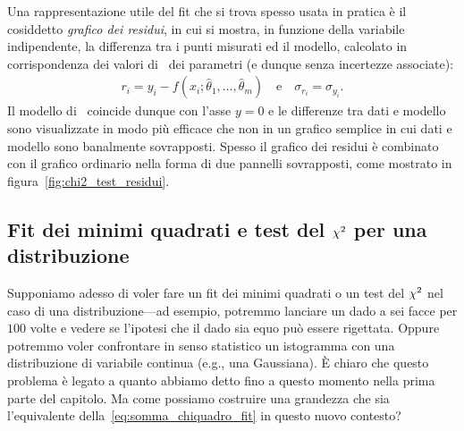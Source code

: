 Una rappresentazione utile del fit che si trova spesso usata in pratica
è il cosiddetto \emph{grafico dei residui}, in cui si mostra, in funzione
della variabile indipendente, la differenza tra i punti misurati ed il modello,
calcolato in corrispondenza dei valori di \bestfit\ dei parametri (e
dunque senza incertezze associate):
\begin{align*}
  r_i = y_i - f(x_i; \hat{\theta}_1, \ldots, \hat{\theta}_m)
  \quad \text{e} \quad
  \sigma_{r_i} = \sigma_{y_i}.
\end{align*}
Il modello di \bestfit\ coincide dunque con l'asse $y = 0$ e le
differenze tra dati e modello sono visualizzate in modo più efficace che non
in un grafico semplice in cui dati e modello sono banalmente sovrapposti.
Spesso il grafico dei residui è combinato con il grafico ordinario nella
forma di due pannelli sovrapposti, come mostrato in
figura~\ref{fig:chi2_test_residui}.



\subsection{Fit dei minimi quadrati e test del \texorpdfstring{$\chi^2$}{chi2}
  per una distribuzione}
\label{sec:test_chi2_distribuzione}

Supponiamo adesso di voler fare un fit dei minimi quadrati o un test del
$\chi^2$ nel caso di una distribuzione---ad esempio, potremmo lanciare un dado
a sei facce per $100$ volte e vedere se l'ipotesi che il dado sia equo può
essere rigettata. Oppure potremmo voler confrontare in senso statistico un
istogramma con una distribuzione di variabile continua (e.g., una Gaussiana).
\`E chiaro che questo problema è legato a quanto abbiamo detto fino a questo
momento nella prima parte del capitolo. Ma come possiamo costruire una grandezza
che sia l'equivalente della~\eqref{eq:somma_chiquadro_fit} in questo nuovo
contesto?

